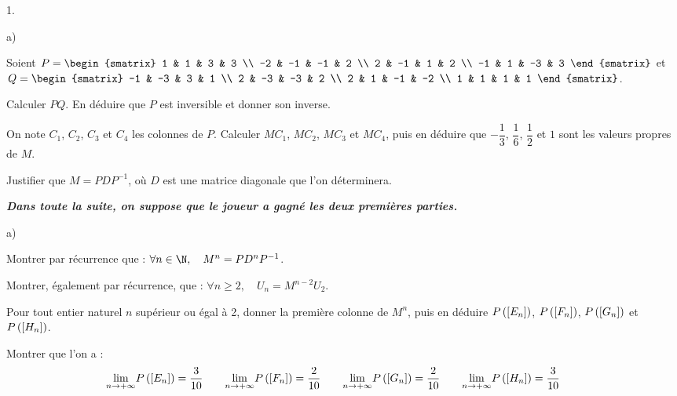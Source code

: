 \documentclass[11pt]{article}%
\begin{document}
\begin{noliste}{1.}
\begin{noliste}{a)}
 \setlength{\itemsep}{2mm}
\item Soient $P = 
\begin{smatrix}
1 & 1 & 3 & 3 \\
-2 & -1 & -1 & 2 \\
2 & -1 & 1 & 2 \\
-1 & 1 & -3 & 3
\end{smatrix}
$ et $Q = 
\begin{smatrix}
-1 & -3 & 3 & 1 \\
2 & -3 & -3 & 2 \\
2 & 1 & -1 & -2 \\
1 & 1 & 1 & 1
\end{smatrix}
$.

Calculer $PQ$. En déduire que $P$ est inversible et donner son inverse.

\item On note $C_{1}$, $C_{2}$, $C_{3}$ et $C_{4}$ les colonnes de $P$.
Calculer $MC_{1}$, $MC_{2}$, $MC_{3}$ et $MC_{4}$, puis en déduire que
$-
\dfrac{1}{3}$, $\dfrac{1}{6}$, $\dfrac{1}{2}$ et $1$ sont les valeurs
propres de $M$.

\item Justifier que $M = PDP^{-1}$, où $D$ est une matrice diagonale
que l'on déterminera.
\end{noliste}

\vspace{0pt} \textbf{\emph{Dans toute la suite, on suppose que le
joueur a
gagné les deux premières parties.}}

\vspace{\normalbaselineskip}

\item 
\begin{noliste}{a)}
 \setlength{\itemsep}{2mm}
\item Montrer par récurrence que : $\forall n\in \N,\quad
M^{n} = PD^{n}P^{-1}$.

\item Montrer, également par récurrence, que : $\forall n\geq 2,\quad
U_{n} = M^{n-2}U_{2}$.

\item Pour tout entier naturel $n$ supérieur ou égal à 2, donner la
première
colonne de $M^{n}$, puis en déduire $P\left(\left[ { E_{n}} \right]\right) $,
$P\left(\left[ {
F_{n}} \right]\right) $, $P\left(\left[ { G_{n}} \right]\right) $ et $P\left(\left[ {
H_{n}} \right]\right) $.

\item Montrer que l'on a : 
\[
\underset{n\rightarrow + \infty }{\lim }P\left(\left[ { E_{n}} \right]\right) =
\dfrac{3}{10}
\qquad \underset{n\rightarrow + \infty }{\lim }P\left(\left[ {
F_{n}} \right]\right) = \dfrac{2
}{10}\qquad \underset{n\rightarrow + \infty }{\lim }P\left(\left[ {
G_{n}} \right]\right) = 
\dfrac{2}{10}\qquad \underset{n\rightarrow + \infty }{\lim }P\left(\left[ {
H_{n}} \right]\right) = \dfrac{3}{10}\qquad
\]
\end{noliste}


\end{noliste}
\end{document}
